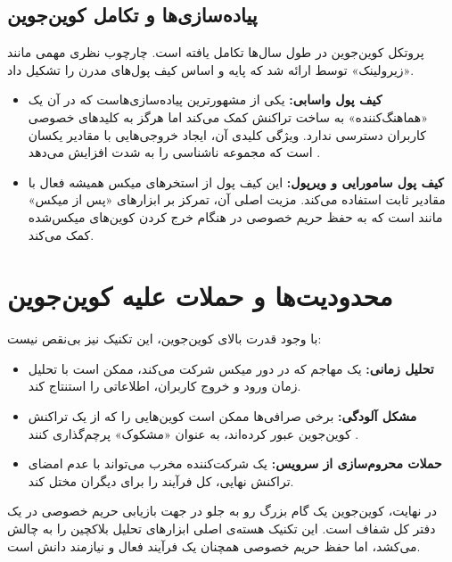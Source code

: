 \subsection{پیاده‌سازی‌ها و تکامل کوین‌جوین}
پروتکل کوین‌جوین در طول سال‌ها تکامل یافته است. چارچوب نظری مهمی مانند «زیرولینک» توسط  ارائه شد که پایه و اساس کیف پول‌های مدرن را تشکیل داد.
\begin{itemize}
	\item \textbf{کیف پول واسابی:} یکی از مشهورترین پیاده‌سازی‌هاست که در آن یک «هماهنگ‌کننده» به ساخت تراکنش کمک می‌کند اما هرگز به کلیدهای خصوصی کاربران دسترسی ندارد. ویژگی کلیدی آن، ایجاد خروجی‌هایی با مقادیر یکسان است که مجموعه ناشناسی را به شدت افزایش می‌دهد \cite{antonopoulos_mastering}.
	
	\item \textbf{کیف پول سامورایی و ویرپول:} این کیف پول از استخرهای میکس همیشه فعال با مقادیر ثابت استفاده می‌کند. مزیت اصلی آن، تمرکز بر ابزارهای «پس از میکس» مانند  است که به حفظ حریم خصوصی در هنگام خرج کردن کوین‌های میکس‌شده کمک می‌کند.
\end{itemize}

\section{محدودیت‌ها و حملات علیه کوین‌جوین}
با وجود قدرت بالای کوین‌جوین، این تکنیک نیز بی‌نقص نیست:
\begin{itemize}
	\item \textbf{تحلیل زمانی:} یک مهاجم که در دور میکس شرکت می‌کند، ممکن است با تحلیل زمان ورود و خروج کاربران، اطلاعاتی را استنتاج کند.
	
	\item \textbf{مشکل آلودگی:} برخی صرافی‌ها ممکن است کوین‌هایی را که از یک تراکنش کوین‌جوین عبور کرده‌اند، به عنوان «مشکوک» پرچم‌گذاری کنند \cite{antonopoulos_mastering}.
	
	\item \textbf{حملات محروم‌سازی از سرویس:} یک شرکت‌کننده مخرب می‌تواند با عدم امضای تراکنش نهایی، کل فرآیند را برای دیگران مختل کند.
\end{itemize}

در نهایت، کوین‌جوین یک گام بزرگ رو به جلو در جهت بازیابی حریم خصوصی در یک دفتر کل شفاف است. این تکنیک هسته‌ی اصلی ابزارهای تحلیل بلاکچین را به چالش می‌کشد، اما حفظ حریم خصوصی همچنان یک فرآیند فعال و نیازمند دانش است.